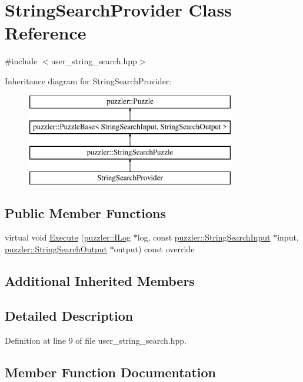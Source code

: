 \hypertarget{a00034}{}\section{String\+Search\+Provider Class Reference}
\label{a00034}


{\ttfamily \#include $<$user\+\_\+string\+\_\+search.\+hpp$>$}

Inheritance diagram for String\+Search\+Provider\+:\begin{figure}[H]
\begin{center}
\leavevmode
\includegraphics[height=4.000000cm]{a00034}
\end{center}
\end{figure}
\subsection*{Public Member Functions}
\begin{DoxyCompactItemize}
\item 
virtual void \hyperlink{a00034_a139312a56443b786f10caa395f9c4f88}{Execute} (\hyperlink{a00008}{puzzler\+::\+I\+Log} $\ast$log, const \hyperlink{a00032}{puzzler\+::\+String\+Search\+Input} $\ast$input, \hyperlink{a00033}{puzzler\+::\+String\+Search\+Output} $\ast$output) const override
\end{DoxyCompactItemize}
\subsection*{Additional Inherited Members}


\subsection{Detailed Description}


Definition at line 9 of file user\+\_\+string\+\_\+search.\+hpp.



\subsection{Member Function Documentation}
\hypertarget{a00034_a139312a56443b786f10caa395f9c4f88}{}
